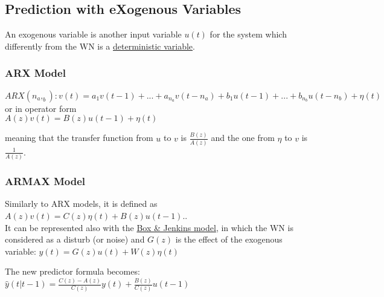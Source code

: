 \documentclass[10pt,a4paper]{article}
\begin{document}
\subsection{Prediction with eXogenous Variables}
An exogenous variable is another input variable $u(t)$ for the system which differently from the WN is a \uline{deterministic variable}.
\subsubsection{ARX Model}
\center $ARX(n_a,_b): v(t)=a_1v(t-1)+...+a_{n_a}v(t-n_a)+b_1u(t-1)+...+b_{n_b}u(t-n_b)+\eta(t)$ 
\\ \vspace{0.3em}
or in operator form
\\ \vspace{0.3em}
$A(z)v(t)=B(z)u(t-1)+\eta(t)$
\\ \raggedright \vspace{0.5em}
meaning that the transfer function from $u$ to $v$ is $\frac{B(z)}{A(z)}$ and the one from $\eta$ to $v$ is $\frac{1}{A(z)}$.
\subsubsection{ARMAX Model}
Similarly to ARX models, it is defined as $A(z)v(t)=C(z)\eta(t)+B(z)u(t-1).$. \\
It can be represented also with the \uline{Box \& Jenkins model}, in which the WN is considered as a disturb (or noise) and $G(z)$ is the effect of the exogenous variable: 
\center 
$y(t)=G(z)u(t)+W(z)\eta(t)$
\\ \raggedright \vspace{0.5em}
The new predictor formula becomes:
\center 
$\hat{y}(t|t-1)=\frac{C(z)-A(z)}{C(z)}y(t)+\frac{B(z)}{C(z)}u(t-1)$
\\ \raggedright
\end{document}

